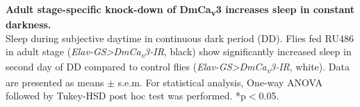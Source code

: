 \label{fig:S}
\textbf{Adult stage-specific knock-down of DmCa\textsubscript{v}3 increases sleep in constant darkness.}
\\
Sleep during subjective daytime in continuous dark period (DD). 
Flies fed RU486 in adult stage (\emph{Elav-GS\textgreater{}DmCa\textsubscript{v}3-IR}, black) show significantly increased sleep in second day of DD compared to control flies (\emph{Elav-GS\textgreater{}DmCa\textsubscript{v}3-IR}, white).
Data are presented as means $\pm$ s.e.m.
For statistical analysis, One-way ANOVA followed by Tukey-HSD post hoc test was performed.
*p$<$0.05.
  